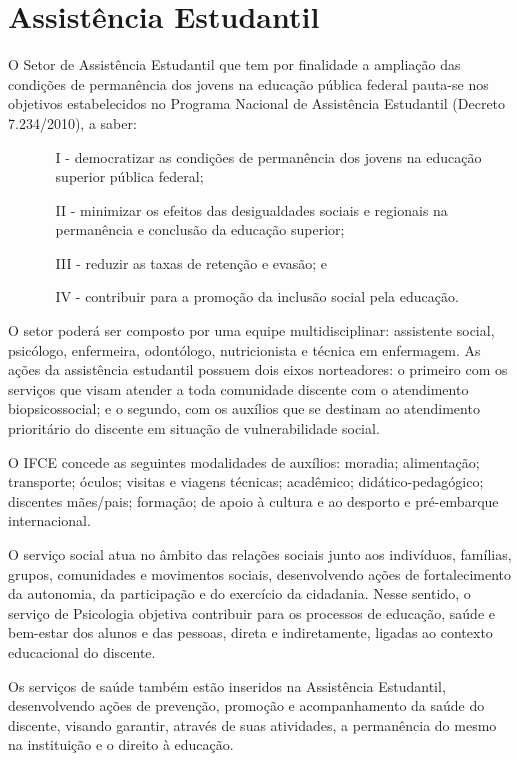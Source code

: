 \documentclass[
	12pt,				%
	openright,			%
	twoside,			%
	a4paper,			%
	chapter=TITLE,		%
	english,			%
	french,				%
	spanish,			%
	brazil,				%
	]{abntex2}
\begin{document}
\section{Assistência Estudantil}
O  Setor de Assistência Estudantil que tem por finalidade a ampliação das condições de permanência dos jovens na educação pública federal pauta-se nos objetivos estabelecidos no Programa Nacional de Assistência Estudantil (Decreto 7.234/2010), a saber:
\begin{itemize}
\item[]
\begin{itemize}
    \setlength\itemsep{0em}
    \item[I -] democratizar as condições de permanência dos jovens na educação superior pública federal;
    \item[II -] minimizar os efeitos das desigualdades sociais e regionais na permanência e conclusão da educação superior;
    \item[III -] reduzir as taxas de retenção e evasão; e
    \item[IV -] contribuir para a promoção da inclusão social pela educação.
\end{itemize}
\end{itemize}

O setor poderá ser composto por uma equipe multidisciplinar: assistente social, psicólogo,
enfermeira, odontólogo, nutricionista e técnica em enfermagem. As ações da assistência estudantil possuem dois eixos norteadores: o primeiro com os serviços que visam atender a toda comunidade discente com o atendimento biopsicossocial; e o segundo, com os auxílios que se destinam ao atendimento prioritário do discente em situação de vulnerabilidade social.


O IFCE concede as seguintes modalidades de auxílios: moradia; alimentação; transporte; óculos; visitas e viagens técnicas; acadêmico; didático-pedagógico; discentes mães/pais; formação; de apoio à cultura e ao desporto e pré-embarque internacional.

O serviço social atua no âmbito das relações sociais junto aos indivíduos, famílias, grupos, comunidades e movimentos sociais, desenvolvendo ações de fortalecimento da autonomia, da participação e do exercício da cidadania. Nesse sentido, o serviço de Psicologia objetiva contribuir para os processos de educação, saúde e bem-estar dos alunos e das pessoas, direta e indiretamente, ligadas ao contexto educacional do discente.

Os serviços de saúde também estão inseridos na Assistência Estudantil, desenvolvendo ações de prevenção, promoção e acompanhamento da saúde do discente, visando garantir, através de suas atividades, a permanência do mesmo na instituição e o direito à educação.
\end{document}
